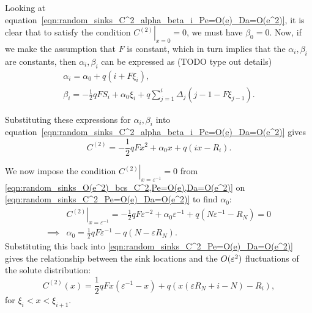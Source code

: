 Looking at
equation~\eqref{eqn:random_sinks_C^2_alpha_beta_i_Pe=O(e)_Da=O(e^2)}, it is
clear that to satisfy the condition \(\left.C^{(2)}\right|_{x=0} = 0\), we must
have \(\beta_0 = 0\). Now, if we make the assumption that \(F\) is constant,
which in turn implies that the \(\alpha_i,\beta_i\) are constants, then
\(\alpha_i, \beta_i\) can be expressed as (TODO type out details)
\begin{subequations}
    \label{eqn:alpha_beta_i_F_const}
    \begin{gather}
        \label{eqn:alpha_i_F_const}
        \alpha_i=\alpha_0 + q(i + F\xi_i),\\
        \label{eqn:beta_i_F_const}
        \beta_i=-\frac{1}{2} q F S_i + \alpha_{0}\xi_i + q \sum_{j=1}^i
        \Delta_j\left(j - 1 - F\xi_{j-1}\right).
    \end{gather}
\end{subequations}

Substituting these expressions for \(\alpha_i, \beta_i\) into
equation~\eqref{eqn:random_sinks_C^2_alpha_beta_i_Pe=O(e)_Da=O(e^2)} gives
\begin{equation}
    \label{eqn:random_sinks_C^2_Pe=O(e)_Da=O(e^2)}
    C^{(2)} = -\frac{1}{2} q F x^2 + \alpha_0 x + q(ix - R_i).
\end{equation}

We now impose the condition \(\left.C^{(2)}\right|_{x=\varepsilon^{-1}}=0\)
from \eqref{eqn:random_sinks_O(e^2)_bcs_C^2,Pe=O(e),Da=O(e^2)} on
\eqref{eqn:random_sinks_C^2_Pe=O(e)_Da=O(e^2)} to find \(\alpha_0\):
\begin{align*}
    &\left.C^{(2)}\right|_{x=\varepsilon^{-1}} = -\frac{1}{2}q F
    \varepsilon^{-2} + \alpha_0\varepsilon^{-1} + q\left(N\varepsilon^{-1} -
    R_N\right) = 0\\
    \implies & \alpha_0 = \frac{1}{2}q F \varepsilon^{-1} - q\left(N -
    \varepsilon R_N\right).
\end{align*}
Substituting this back into \eqref{eqn:random_sinks_C^2_Pe=O(e)_Da=O(e^2)}
gives the relationship between the sink locations and the
\(O(\varepsilon^2)\) fluctuations of the solute distribution:
\begin{equation}
    \label{eqn:random_sinks_C^2_final_Pe=O(e)_Da=O(e^2)}
    C^{(2)}(x) = \frac{1}{2} q F x(\varepsilon^{-1} - x) +
    q\left(x\left(\varepsilon R_N + i - N \right) - R_i\right),
\end{equation}
for \(\xi_i < x < \xi_{i+1}\).

